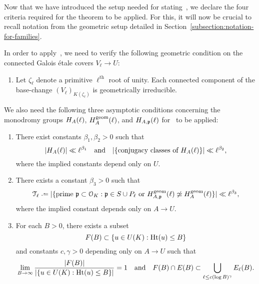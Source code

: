 Now that we have introduced the setup needed for stating~\cite[Theorem 3.9]{scoopdedoo}, we declare the four criteria required for the theorem to be applied. For this, it will now be crucial to recall notation from the geometric setup detailed in Section~\ref{subsection:notation-for-families}.
\begin{definition} \label{definition:assumptions}
In order to apply~\cite[Theorem 3.9]{scoopdedoo}, we need to verify the following geometric condition on the connected Galois \'{e}tale covers $V_\ell \to U$:
\begin{enumerate}
	\item[\customlabel{assumption-4}{(G)}] Let $\zeta_\ell$ denote a primitive $\ell^{\mathrm{th}}$ root of unity. Each connected component of the base-change $(V_{\ell})_{K(\zeta_\ell)}$ is geometrically irreducible.
\end{enumerate}
We also need the following three asymptotic conditions concerning the monodromy groups $H_A(\ell)$, $H_A^{\operatorname{geom}}(\ell)$, and $H_{A, \mathfrak p}(\ell)$ for~\cite[Theorem 3.9]{scoopdedoo} to be applied:
	\begin{enumerate}
		\item[\customlabel{property-a1}{(A1)}] There exist constants $\beta_1, \beta_2 > 0$ such that
		\[
			| H_A(\ell) | \ll \ell^{\beta_1} \quad \text{and} \quad | \{\text{conjugacy classes of } H_A(\ell) \} | \ll \ell^{\beta_2},
		\]
        where the implied constants depend only on $U$.
		\item[\customlabel{property-a2}{(A2)}] There exists a constant $\beta_3 > 0$ such that
		\[
			\geometricprimes \ell \defeq |\{ \text{prime } \mf{p} \subset \OO_K : \mf{p} \in S \cup P_\ell \text{ or } \mono_{A, \pp}^{\on{geom}}(\ell) \not\simeq \mono_A^{\on{geom}}(\ell) \} | \ll \ell^{\beta_3},
		\]
        where the implied constant depends only on $A \rightarrow U$.
		\item[\customlabel{property-a3}{(A3)}] For each $B > 0$, there exists a subset
		\[
			F(B) \subset \{u \in U(K) : \operatorname{Ht}(u) \le B\}
		\]
		and constants $c, \gamma > 0$ depending only on $A \rightarrow U$ such that
		\begin{align*}
		\lim_{B \to \infty} \frac{|F(B)|}{|\{u \in U(K) : \operatorname{Ht}(u) \le B\}|} = 1	\quad \text{and} \quad F(B) \cap E(B) \subset \bigcup_{\ell \le c (\log B)^\gamma} E_{ \ell}(B).
		\end{align*}
	\end{enumerate}
\end{definition}

